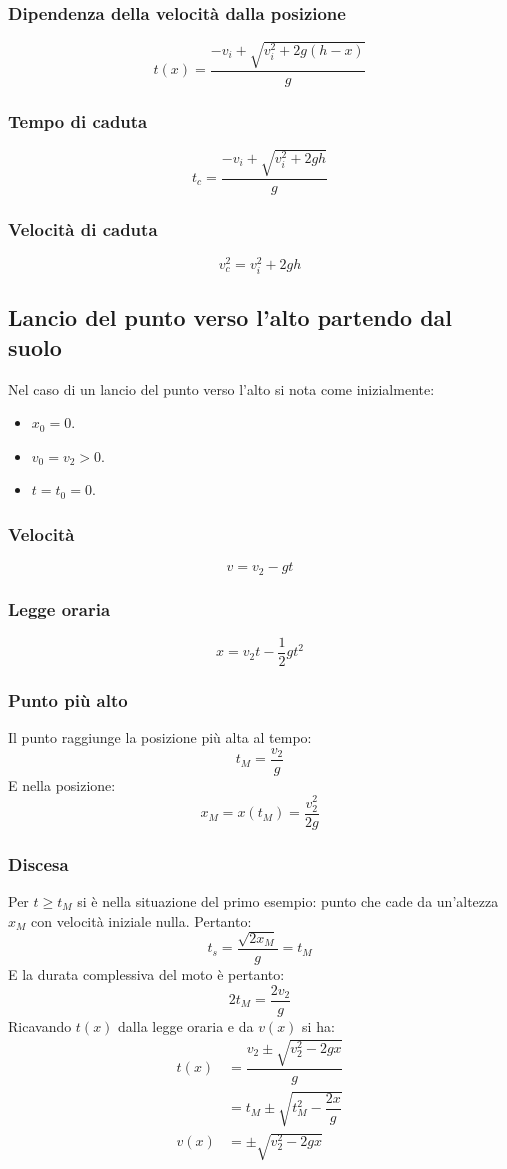 \documentclass[class=book, crop=false, oneside, 12pt]{standalone}
\begin{document}
		\subsubsection{Dipendenza della velocit\`a dalla posizione}
		$$t(x) = \dfrac{-v_i+\sqrt{v_i^2+2g(h-x)}}{g}$$
		\subsubsection{Tempo di caduta}
		$$t_c = \dfrac{-v_i+\sqrt{v_i^2+2gh}}{g}$$
		\subsubsection{Velocit\`a di caduta}
		$$v_c^2=v_i^2+2gh$$
	\subsection{Lancio del punto verso l'alto partendo dal suolo}
	Nel caso di un lancio del punto verso l'alto si nota come inizialmente:
	\begin{multicols}{3}
		\begin{itemize}
			\item $x_0=0$.
			\item $v_0 = v_2 > 0$.
			\item $t=t_0=0$.
		\end{itemize}
	\end{multicols}
		\subsubsection{Velocit\`a}
		$$v=v_2 - gt$$
		\subsubsection{Legge oraria}
		$$x = v_2t-\dfrac{1}{2}gt^2$$
		\subsubsection{Punto pi\`u alto}
		Il punto raggiunge la posizione pi\`u alta al tempo:
		$$t_M = \dfrac{v_2}{g}$$
		E nella posizione:
		$$x_M=x(t_M)=\dfrac{v_2^2}{2g}$$
		\subsubsection{Discesa}
		Per $t\ge t_M$ si \`e nella situazione del primo esempio: punto che cade da un'altezza $x_M$ con velocit\`a iniziale nulla.
		Pertanto:
		$$t_s = \frac{\sqrt{2x_M}}{g}=t_M$$
		E la durata complessiva del moto \`e pertanto:
		$$2t_M = \dfrac{2v_2}{g}$$
		Ricavando $t(x)$ dalla legge oraria e da $v(x)$ si ha:
		\begin{align*}
			t(x) &= \dfrac{v_2\pm \sqrt{v_2^2 - 2gx}}{g}\\
			     &= t_M \pm \sqrt{t_M^2 - \dfrac{2x}{g}}\\
			v(x) &= \pm \sqrt{v_2^2 - 2gx}
		\end{align*}
\end{document}

